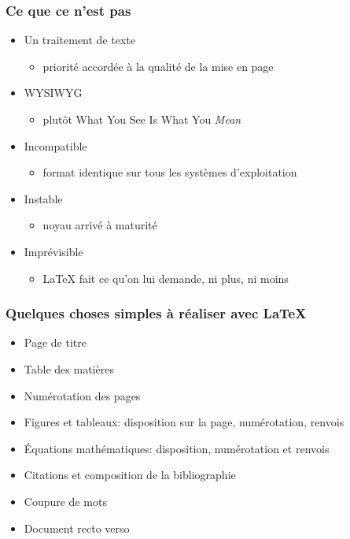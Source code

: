 \begin{frame}
  \frametitle{Ce que ce n'est pas}
  \begin{itemize}
  \item Un traitement de texte
    \begin{itemize}
    \item priorité accordée à la qualité de la mise en page
    \end{itemize}
  \item WYSIWYG
    \begin{itemize}
    \item plutôt What You See Is What You \emph{Mean}
    \end{itemize}
  \item Incompatible
    \begin{itemize}
    \item format identique sur tous les systèmes d'exploitation
    \end{itemize}
  \item Instable
    \begin{itemize}
    \item noyau arrivé à maturité
    \end{itemize}
  \item Imprévisible
    \begin{itemize}
    \item {\LaTeX} fait ce qu'on lui demande, ni plus, ni moins
    \end{itemize}
  \end{itemize}
\end{frame}

\begin{frame}
  \frametitle{Quelques choses simples à réaliser avec {\LaTeX}}

  \begin{itemize}
  \item Page de titre
  \item Table des matières
  \item Numérotation des pages
  \item Figures et tableaux: disposition sur la page, numérotation, renvois
  \item Équations mathématiques: disposition, numérotation et renvois
  \item Citations et composition de la bibliographie
  \item Coupure de mots
  \item Document recto verso
  \end{itemize}
\end{frame}

